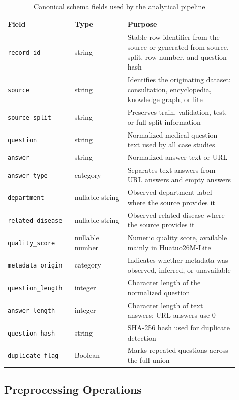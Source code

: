\documentclass[12pt,a4paper]{article}
\begin{document}
\begin{table}[H]
\centering
\small
\caption{Canonical schema fields used by the analytical pipeline}
\label{tab:canonical-schema}
\begin{tabular}{p{0.25\linewidth}p{0.21\linewidth}p{0.44\linewidth}}
\toprule
Field & Type & Purpose \\
\midrule
\texttt{record\_id} & string & Stable row identifier from the source or generated from source, split, row number, and question hash \\
\texttt{source} & string & Identifies the originating dataset: consultation, encyclopedia, knowledge graph, or lite \\
\texttt{source\_split} & string & Preserves train, validation, test, or full split information \\
\texttt{question} & string & Normalized medical question text used by all case studies \\
\texttt{answer} & string & Normalized answer text or URL \\
\texttt{answer\_type} & category & Separates text answers from URL answers and empty answers \\
\texttt{department} & nullable string & Observed department label where the source provides it \\
\texttt{related\_disease} & nullable string & Observed related disease where the source provides it \\
\texttt{quality\_score} & nullable number & Numeric quality score, available mainly in Huatuo26M-Lite \\
\texttt{metadata\_origin} & category & Indicates whether metadata was observed, inferred, or unavailable \\
\texttt{question\_length} & integer & Character length of the normalized question \\
\texttt{answer\_length} & integer & Character length of text answers; URL answers use 0 \\
\texttt{question\_hash} & string & SHA-256 hash used for duplicate detection \\
\texttt{duplicate\_flag} & Boolean & Marks repeated questions across the full union \\
\bottomrule
\end{tabular}
\end{table}

\subsection{Preprocessing Operations}
\end{document}
